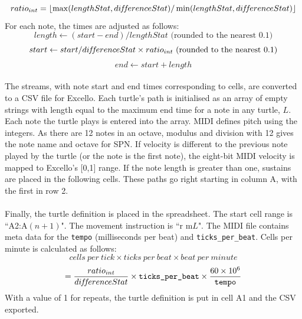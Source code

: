   $$ratio_{int} = \lfloor\max(lengthStat, di\hspace{-0.1em}f\hspace{-0.2em}f\hspace{-0.1em}erenceStat)/\min(lengthStat, di\hspace{-0.1em}f\hspace{-0.2em}f\hspace{-0.1em}erenceStat)\rfloor$$
For each note, the times are adjusted as follows:
  $$length \gets (start - end) / lengthStat \text{ (rounded to the nearest 0.1)}$$
  $$start \gets start / di\hspace{-0.1em}f\hspace{-0.2em}f\hspace{-0.1em}erenceStat \times ratio_{int} \text{ (rounded to the nearest 0.1)}$$
  $$end \gets start +length$$

\paragraph{} The streams, with note start and end times corresponding to cells, are converted to a CSV file for Excello. Each turtle's path is initialised as an array of empty strings with length equal to the maximum end time for a note in any turtle, $L$.  Each note the turtle plays is entered into the array. MIDI defines pitch using the integers. As there are 12 notes in an octave, modulus and division with 12 gives the note name and octave for SPN. If velocity is different to the previous note played by the turtle (or the note is the first note), the eight-bit MIDI velocity is mapped to Excello's [0,1] range. If the note length is greater than one, sustains are placed in the following cells. These paths go right starting in column A, with the first in row 2.

\paragraph{} Finally, the turtle definition is placed in the spreadsheet. The start cell range is ``A2:A$(n+1)$". The movement instruction is ``r m$L$". The MIDI file contains meta data for the \texttt{tempo} (milliseconds per beat) and \texttt{ticks\_per\_beat}. Cells per minute is calculated as follows:
  $$cells\ per\ tick \times ticks\ per\ beat \times beat\ per\ minute$$
  $$= \frac{ratio_{int}}{di\hspace{-0.1em}f\hspace{-0.2em}f\hspace{-0.1em}erenceStat} \times \texttt{ticks\_per\_beat} \times \frac{60 \times 10^6}{\texttt{tempo}}$$
With a value of 1 for repeats, the turtle definition is put in cell A1 and the CSV exported.


